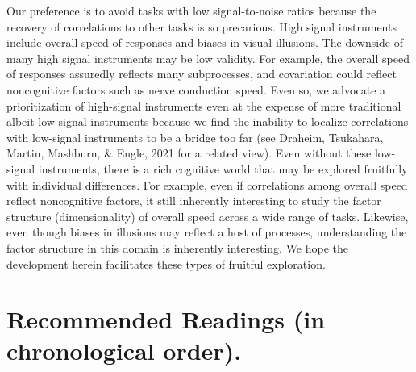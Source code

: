 \documentclass[
  ,man]{apa6}
\begin{document}
Our preference is to avoid tasks with low signal-to-noise ratios because the recovery of correlations to other tasks is so precarious. High signal instruments include overall speed of responses and biases in visual illusions. The downside of many high signal instruments may be low validity. For example, the overall speed of responses assuredly reflects many subprocesses, and covariation could reflect noncognitive factors such as nerve conduction speed. Even so, we advocate a prioritization of high-signal instruments even at the expense of more traditional albeit low-signal instruments because we find the inability to localize correlations with low-signal instruments to be a bridge too far (see Draheim, Tsukahara, Martin, Mashburn, \& Engle, 2021 for a related view). Even without these low-signal instruments, there is a rich cognitive world that may be explored fruitfully with individual differences. For example, even if correlations among overall speed reflect noncognitive factors, it still inherently interesting to study the factor structure (dimensionality) of overall speed across a wide range of tasks. Likewise, even though biases in illusions may reflect a host of processes, understanding the factor structure in this domain is inherently interesting. We hope the development herein facilitates these types of fruitful exploration.

\hypertarget{recommended-readings-in-chronological-order.}{%
\section{Recommended Readings (in chronological order).}\label{recommended-readings-in-chronological-order.}}
\end{document}
